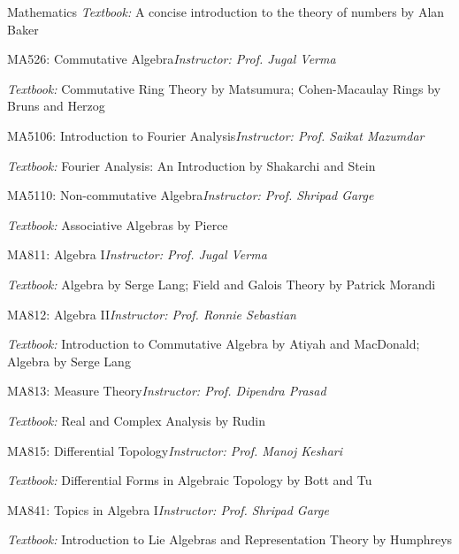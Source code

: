 \begin{rubric}{Mathematics}
    \emph{Textbook:} A concise introduction to the theory of numbers by Alan Baker

    \entry*[AA] MA526: Commutative Algebra\hfill\emph{Instructor: Prof. Jugal Verma}

    \emph{Textbook:} Commutative Ring Theory by Matsumura; Cohen-Macaulay Rings by Bruns and Herzog

    \entry*[AA] MA5106: Introduction to Fourier Analysis\hfill\emph{Instructor: Prof. Saikat Mazumdar}

    \emph{Textbook:} Fourier Analysis: An Introduction by Shakarchi and Stein

    \entry*[AA] MA5110: Non-commutative Algebra\hfill\emph{Instructor: Prof. Shripad Garge}

    \emph{Textbook:} Associative Algebras by Pierce 

    \entry*[AA] MA811: Algebra I\hfill\emph{Instructor: Prof. Jugal Verma}

    \emph{Textbook:} Algebra by Serge Lang; Field and Galois Theory by Patrick Morandi

    \entry*[AA] MA812: Algebra II\hfill\emph{Instructor: Prof. Ronnie Sebastian}

    \emph{Textbook:} Introduction to Commutative Algebra by Atiyah and MacDonald; Algebra by Serge Lang

    \entry*[AA] MA813: Measure Theory\hfill\emph{Instructor: Prof. Dipendra Prasad}

    \emph{Textbook:} Real and Complex Analysis by Rudin 

    \entry*[AA] MA815: Differential Topology\hfill\emph{Instructor: Prof. Manoj Keshari}

    \emph{Textbook:} Differential Forms in Algebraic Topology by Bott and Tu

    \entry*[AA] MA841: Topics in Algebra I\hfill\emph{Instructor: Prof. Shripad Garge}

    \emph{Textbook:} Introduction to Lie Algebras and Representation Theory by Humphreys
\end{rubric}